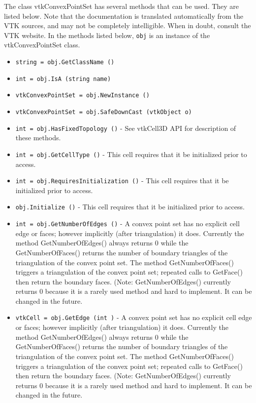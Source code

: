 The class vtkConvexPointSet has several methods that can be used.
  They are listed below.
Note that the documentation is translated automatically from the VTK sources,
and may not be completely intelligible.  When in doubt, consult the VTK website.
In the methods listed below, \verb|obj| is an instance of the vtkConvexPointSet class.
\begin{itemize}
\item  \verb|string = obj.GetClassName ()|

\item  \verb|int = obj.IsA (string name)|

\item  \verb|vtkConvexPointSet = obj.NewInstance ()|

\item  \verb|vtkConvexPointSet = obj.SafeDownCast (vtkObject o)|

\item  \verb|int = obj.HasFixedTopology ()| -  See vtkCell3D API for description of these methods.

\item  \verb|int = obj.GetCellType ()| -  This cell requires that it be initialized prior to access.

\item  \verb|int = obj.RequiresInitialization ()| -  This cell requires that it be initialized prior to access.

\item  \verb|obj.Initialize ()| -  This cell requires that it be initialized prior to access.

\item  \verb|int = obj.GetNumberOfEdges ()| -  A convex point set has no explicit cell edge or faces; however
 implicitly (after triangulation) it does. Currently the method
 GetNumberOfEdges() always returns 0 while the GetNumberOfFaces() returns
 the number of boundary triangles of the triangulation of the convex
 point set. The method GetNumberOfFaces() triggers a triangulation of the
 convex point set; repeated calls to GetFace() then return the boundary
 faces. (Note: GetNumberOfEdges() currently returns 0 because it is a
 rarely used method and hard to implement. It can be changed in the future.

\item  \verb|vtkCell = obj.GetEdge (int )| -  A convex point set has no explicit cell edge or faces; however
 implicitly (after triangulation) it does. Currently the method
 GetNumberOfEdges() always returns 0 while the GetNumberOfFaces() returns
 the number of boundary triangles of the triangulation of the convex
 point set. The method GetNumberOfFaces() triggers a triangulation of the
 convex point set; repeated calls to GetFace() then return the boundary
 faces. (Note: GetNumberOfEdges() currently returns 0 because it is a
 rarely used method and hard to implement. It can be changed in the future.


\end{itemize}
